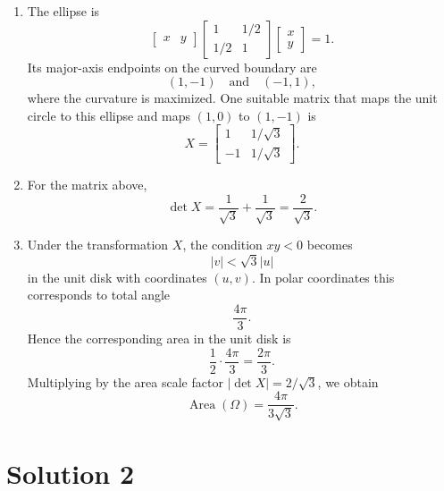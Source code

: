\documentclass[10pt,a4paper]{article}
\begin{document}
\begin{enumerate}
  \item The ellipse is
        \[
          \begin{bmatrix}x&y\end{bmatrix}
          \begin{bmatrix}
            1 & 1/2\\
            1/2 & 1
          \end{bmatrix}
          \begin{bmatrix}x\\y\end{bmatrix}
          =1.
        \]
        Its major-axis endpoints on the curved boundary are
        \[
          (1,-1)
          \quad\text{and}\quad
          (-1,1),
        \]
        where the curvature is maximized. One suitable matrix that maps the unit circle to this ellipse and maps $(1,0)$ to $(1,-1)$ is
        \[
          \boxed{
          X=
          \begin{bmatrix}
            1 & 1/\sqrt{3}\\
            -1 & 1/\sqrt{3}
          \end{bmatrix}.}
        \]

  \item For the matrix above,
        \[
          \det X
          =
          \frac{1}{\sqrt3}+\frac{1}{\sqrt3}
          =
          \boxed{\frac{2}{\sqrt3}.}
        \]

  \item Under the transformation $X$, the condition $xy<0$ becomes
        \[
          |v|<\sqrt3|u|
        \]
        in the unit disk with coordinates $(u,v)$. In polar coordinates this corresponds to total angle
        \[
          \frac{4\pi}{3}.
        \]
        Hence the corresponding area in the unit disk is
        \[
          \frac12\cdot\frac{4\pi}{3}
          =
          \frac{2\pi}{3}.
        \]
        Multiplying by the area scale factor $|\det X|=2/\sqrt3$, we obtain
        \[
          \boxed{
          \operatorname{Area}(\Omega)=
          \frac{4\pi}{3\sqrt3}.}
        \]
\end{enumerate}

\section*{Solution 2}
\end{document}
